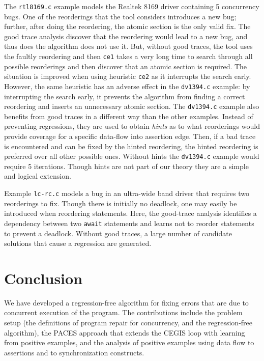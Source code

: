 \documentclass{llncs}
\begin{document}
The  {\tt rtl8169.c} example
models the Realtek 8169 driver containing 5 concurrency bugs.  One of
the reorderings that the tool considers introduces a new bug; further, after
doing the reordering, the atomic section is the only valid fix. 
The good trace analysis discover that the reordering would lead to a
new bug, and thus does the algorithm does not use it.
But, without good traces, the tool uses the faultly reordering and then
{\tt ce1} takes a very long time to search through all possible reorderings
and then discover that an atomic section is required.
The situation is improved when using heuristic {\tt ce2} as it
interrupts the search early.  However, the same heuristic has an adverse 
effect in the {\tt dv1394.c} example: by interrupting  
the search early, it prevents the algorithm from finding a correct 
reordering and inserts an unnecessary atomic section.
The {\tt dv1394.c} example also benefits from good traces in a different
way than the other examples.
Instead of preventing regressions, they are used
to obtain {\em hints} as to what reorderings would provide coverage
for a specific data-flow into assertion edge. 
Then, if a bad trace is encountered and can be fixed by the hinted
reordering, the hinted reordering is preferred over all other possible
ones.
Without hints the {\tt dv1394.c} example
would require 5 iterations. Though hints are not part of our theory they
are a simple and logical extension.

Example {\tt lc-rc.c} models a bug in an ultra-wide 
band driver that requires two reorderings to fix. Though there is initially 
no deadlock, one may easily be introduced when reordering statements.
Here, the good-trace analysis identifies a dependency 
between two {\tt await} statements and learns not to reorder statements
to prevent a deadlock. 
Without good traces, a large number of candidate solutions that cause
a regression are generated.  

\vspace{-1ex}
\section{Conclusion}
We have developed a regression-free algorithm for fixing errors that
are due to concurrent execution of the program. The contributions
include the problem setup (the definitions of program repair for
concurrency, and the regression-free algorithm), the PACES approach
that extends the CEGIS loop with learning from positive examples, and
the analysis of positive examples using data flow to assertions and to
synchronization constructs.   
\end{document}
